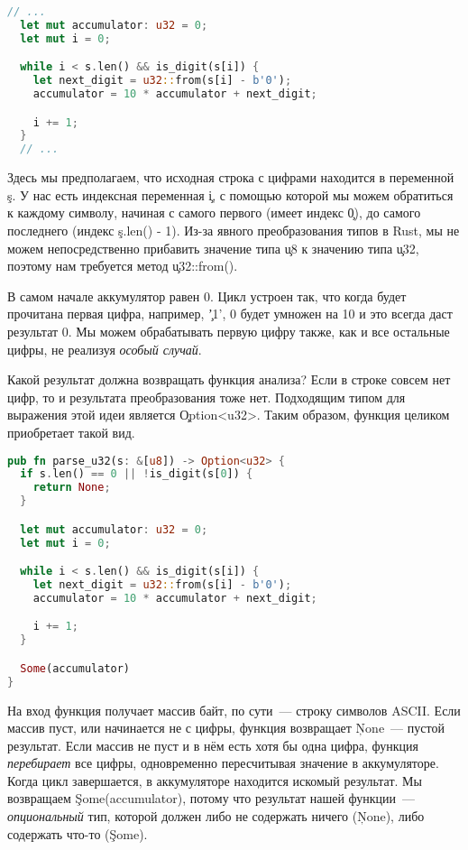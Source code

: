 \begin{lstlisting}[language=Rust]
  // ...
  let mut accumulator: u32 = 0;
  let mut i = 0;

  while i < s.len() && is_digit(s[i]) {
    let next_digit = u32::from(s[i] - b'0');
    accumulator = 10 * accumulator + next_digit;

    i += 1;
  }
  // ...
\end{lstlisting}

Здесь мы предполагаем, что исходная строка с цифрами находится в переменной \c{s}.
У нас есть индексная переменная \c{i}, с помощью которой мы можем обратиться к каждому символу, начиная с самого первого (имеет индекс \c{0}), до самого последнего (индекс \c{s.len() - 1}).
Из-за явного преобразования типов в Rust, мы не можем непосредственно прибавить значение типа \c{u8} к значению типа \c{u32}, поэтому нам требуется метод \c{u32::from()}.

В самом начале аккумулятор равен 0.
Цикл устроен так, что когда будет прочитана первая цифра, например, \c{'1'}, 0 будет умножен на 10 и это всегда даст результат 0.
Мы можем обрабатывать первую цифру также, как и все остальные цифры, не реализуя {\em особый случай}.

Какой результат должна возвращать функция анализа?
Если в строке совсем нет цифр, то и результата преобразования тоже нет.
Подходящим типом для выражения этой идеи является \c{Option<u32>}.
Таким образом, функция целиком приобретает такой вид.

\begin{lstlisting}[language=Rust]
pub fn parse_u32(s: &[u8]) -> Option<u32> {
  if s.len() == 0 || !is_digit(s[0]) {
    return None;
  }

  let mut accumulator: u32 = 0;
  let mut i = 0;

  while i < s.len() && is_digit(s[i]) {
    let next_digit = u32::from(s[i] - b'0');
    accumulator = 10 * accumulator + next_digit;

    i += 1;
  }

  Some(accumulator)
}
\end{lstlisting}

На вход функция получает массив байт, по сути~--- строку символов ASCII.
Если массив пуст, или начинается не с цифры, функция возвращает \c{None}~--- пустой результат.
Если массив не пуст и в нём есть хотя бы одна цифра, функция {\em перебирает} все цифры, одновременно пересчитывая значение в аккумуляторе.
Когда цикл завершается, в аккумуляторе находится искомый результат.
Мы возвращаем \c{Some(accumulator)}, потому что результат нашей функции~--- {\em опциональный} тип, которой должен либо не содержать ничего (\c{None}), либо содержать что-то (\c{Some}).

